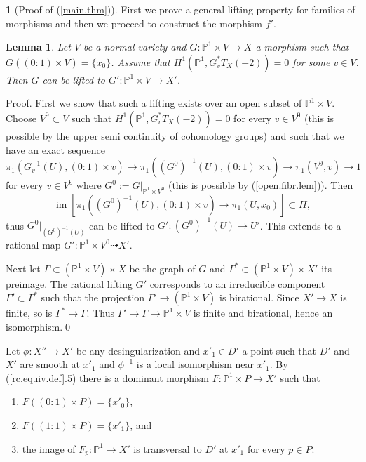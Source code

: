 \documentclass[12pt,twoside]{amsart}
\newcommand{\p}[0]{{\mathbb P}}
\newcommand{\map}[0]{\dasharrow}
\newcommand{\im}[0]{\operatorname{im}}
\newtheorem{lem}[thm]{Lemma}
\theoremstyle{definition}
\newtheorem{say}[thm]{}
\theoremstyle{remark}
\begin{document}
\begin{say}[Proof of (\ref{main.thm})]
First we prove a general  lifting property for families of morphisms
and then we proceed to construct the morphism $f'$.





\begin{lem}\label{lifting.lem}
 Let $V$ be a normal variety and $G:\p^1\times V\to X$ a morphism
such that $ G((0{\colon\!} 1)\times V)=\{x_0\}$. Assume that
$H^1(\p^1, G_v^*T_X(-2))=0$ for some $v\in V$. 
Then $G$ can be lifted to $G':\p^1\times V\to X'$.
\end{lem}

Proof.  First we show that such a lifting exists over an open subset
of  $\p^1\times  V$.
Choose $V^0\subset V$
 such that $H^1(\p^1, G_v^*T_X(-2))=0$ for every $v\in V^0$
(this is possible by the upper semi continuity of cohomology groups)
and such that we have an exact sequence
$$
\pi_1(G_v^{-1}(U), (0{\colon\!} 1)\times v)\to 
\pi_1((G^0)^{-1}(U),(0{\colon\!} 1)\times v)\to \pi_1(V^0,v)\to 1
$$
for every $v\in V^0$
where $G^0:=G|_{\p^1\times V^0}$  (this is possible by (\ref{open.fibr.lem})). 
Then
$$
 \im[\pi_1((G^0)^{-1}(U), (0{\colon\!} 1)\times v)\to \pi_1(U,x_0)]\subset H,
 $$
 thus $G^0|_{(G^0)^{-1}(U)}$ can be lifted to
 $G':(G^0)^{-1}(U)\to U'$. This extends to a rational map
  $G':\p^1\times V^0\map X'$.
  
  Next let $\Gamma\subset  (\p^1\times V)\times X$ be the graph of $G$
  and  $\Gamma^*\subset  (\p^1\times V)\times X'$  its preimage.
  The rational lifting $G'$ corresponds to an irreducible
  component $\Gamma'\subset \Gamma^*$ such that the projection
  $\Gamma'\to (\p^1\times V)$ is birational. Since $X'\to X$ is finite,
  so is $\Gamma^*\to \Gamma$. Thus $\Gamma'\to \Gamma\to \p^1\times V$
 is finite and
 birational,
  hence an isomorphism.\qed
  \medskip
 

Let $\phi:X''\to X'$ be any desingularization and $x'_1\in D'$
a point such that $D'$ and $X'$ are smooth at $x'_1$ and $\phi^{-1}$ is
a local isomorphism near $x'_1$. 
By (\ref{rc.equiv.def}.5) there is a dominant morphism
$F:\p^1\times P\to X'$ such that
\begin{enumerate}
\item $F((0{\colon\!} 1)\times P)=\{x'_0\}$, 
\item $F((1{\colon\!} 1)\times P)=\{x'_1\}$, and
\item the image of $F_p:\p^1\to X'$ is transversal
to $D'$ at $x'_1$ for every $p\in P$.
\end{enumerate}


\end{say}
\end{document}
